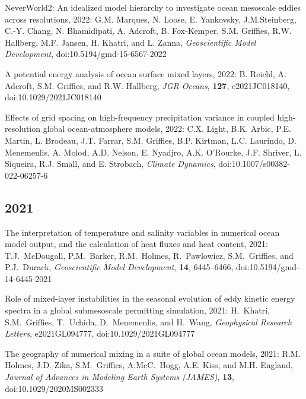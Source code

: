 \begin{etaremune}
\item NeverWorld2: An idealized model hierarchy to investigate ocean mesoscale eddies across resolutions, 2022: G.M. Marques, N. Loose, E. Yankovsky, J.M.Steinberg, C.-Y. Chang, N. Bhamidipati, A. Adcroft, B. Fox-Kemper, S.M. Griffies, R.W. Hallberg, M.F. Jansen, H. Khatri, and L. Zanna, {\it Geoscientific Model Development}, doi:10.5194/gmd-15-6567-2022

\item A potential energy analysis of ocean surface mixed layers, 2022: B. Reichl, A. Adcroft, S.M. Grif\/f\/ies, and R.W. Hallberg, {\it JGR-Oceans}, {\bf 127}, e2021JC018140, doi:10.1029/2021JC018140

\item Effects of grid spacing on high-frequency precipitation variance in coupled high-resolution global ocean-atmosphere models, 2022: C.X. Light, B.K. Arbic, P.E. Martin, L. Brodeau, J.T. Farrar, S.M. Grif\/f\/ies, B.P. Kirtman, L.C. Laurindo,  D. Menemenlis, A. Molod, A.D. Nelson, E. Nyadjro, A.K. O'Rourke,  J.F. Shriver, L. Siqueira, R.J. Small, and E. Strobach, {\it Climate Dynamics}, doi:10.1007/s00382-022-06257-6


\subsection*{\sc \color{Maroon} 2021}

\item The interpretation of temperature and salinity variables in numerical ocean model output, and the calculation of heat fluxes and heat content, 2021: T.J.\ McDougall, P.M.\ Barker, R.M.\ Holmes, R.\ Pawlowicz, S.M.\ Grif\/f\/ies, and P.J.\ Durack, {\it Geoscientific Model Development}, {\bf 14}, 6445–6466, doi:10.5194/gmd-14-6445-2021



\item Role of mixed-layer instabilities in the seasonal evolution of eddy kinetic energy spectra in a global submesoscale permitting simulation, 2021: H.\ Khatri, S.M.\ Grif\/f\/ies, T.\ Uchida, D.\ Menemenlis, and H.\ Wang, {\it  Geophysical Research Letters}, e2021GL094777, doi:10.1029/2021GL094777

\item The geography of numerical mixing in a suite of global ocean models, 2021: R.M. Holmes, J.D. Zika, S.M.\ Grif\/f\/ies,  A.McC.\ Hogg, A.E. Kiss, and M.H. England, {\it Journal of Advances in Modeling Earth Systems (JAMES)}, {\bf 13},  \\ doi:10.1029/2020MS002333


\end{etaremune}
